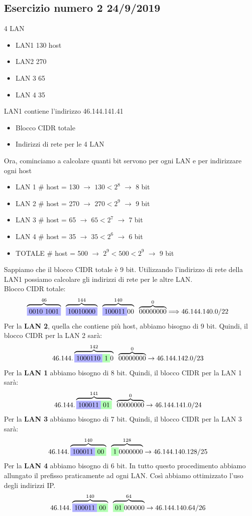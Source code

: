 \documentclass[a4paper]{article}
\begin{document}
\subsection{Esercizio numero 2 24/9/2019}

4 LAN

\begin{itemize}
    \item LAN1 130 host
    \item LAN2 270
    \item LAN 3 65
    \item LAN 4 35
\end{itemize}

LAN1 contiene l'indirizzo 46.144.141.41
\begin{itemize}
    \item Blocco CIDR totale
    \item Indirizzi di rete per le 4 LAN
\end{itemize}
Ora, cominciamo a calcolare quanti bit servono per ogni LAN e per indirizzare ogni host
\begin{itemize}
    \item LAN 1 \# host = 130 $\rightarrow$ $130 < 2^8$ $\rightarrow$ 8 bit
    \item LAN 2 \# host = 270 $\rightarrow$ $270 < 2^9$ $\rightarrow$ 9 bit
    \item LAN 3 \# host = 65 $\rightarrow$ $65 < 2^7$ $\rightarrow$ 7 bit
    \item LAN 4 \# host = 35 $\rightarrow$ $35 < 2^6$ $\rightarrow$ 6 bit
    \item TOTALE \# host = 500 $\rightarrow$ $2^9 < 500 < 2^9$ $\rightarrow$ 9 bit
\end{itemize}
Sappiamo che il blocco CIDR totale è 9 bit. Utilizzando l'indirizzo di rete della LAN1 possiamo calcolare gli indirizzi di rete per le altre LAN.
\\
Blocco CIDR totale:
\[\overbrace{\colorbox{blue!30!white}{0010 1001}}^{46} \; \; \overbrace{\colorbox{blue!30!white}{10010000}}^{144} \; \; \overbrace{\colorbox{blue!30!white}{100011}00}^{140} \; \; \overbrace{00000000}^{0} \Longrightarrow 46.144.140.0/22\]
Per la \textbf{LAN 2}, quella che contiene più host, abbiamo bisogno di 9 bit. Quindi, il blocco CIDR per la LAN 2 sarà:
\[46.144.\overbrace{\colorbox{blue!30!white}{1000110}\colorbox{green!30!white}{1}0}^{142} \; \; \overbrace{00000000}^{0} \rightarrow 46.144.142.0/23\]
Per la \textbf{LAN 1} abbiamo bisogno di 8 bit. Quindi, il blocco CIDR per la LAN 1 sarà:
\[46.144.\overbrace{\colorbox{blue!30!white}{100011}\colorbox{green!30!white}{01}}^{141} \; \; \overbrace{00000000}^{0} \rightarrow 46.144.141.0/24\]
Per la \textbf{LAN 3} abbiamo bisogno di 7 bit. Quindi, il blocco CIDR per la LAN 3 sarà:
\[46.144.\overbrace{\colorbox{blue!30!white}{100011}\colorbox{green!30!white}{00}}^{140} \; \; \overbrace{\colorbox{green!30!white}{1}0000000}^{128} \rightarrow 46.144.140.128/25\]
Per la \textbf{LAN 4} abbiamo bisogno di 6 bit. In tutto questo procedimento abbiamo allungato il prefisso praticamente ad ogni LAN. Così abbiamo ottimizzato l'uso degli indirizzi IP.
\[46.144.\overbrace{\colorbox{blue!30!white}{100011}\colorbox{green!30!white}{00}}^{140} \; \; \overbrace{\colorbox{green!30!white}{01}000000}^{64} \rightarrow 46.144.140.64/26\]
\end{document}
